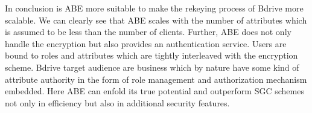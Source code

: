 In conclusion is \ac{ABE} more suitable to make the rekeying process of Bdrive more scalable. We can clearly see that \ac{ABE} scales with the number of attributes which is assumed to be less than the number of clients. Further, \ac{ABE} does not only handle the encryption but also provides an authentication service. Users are bound to roles and attributes which are tightly interleaved with the encryption scheme. Bdrive target audience are business which by nature have some kind of attribute authority in the form of role management and authorization mechanism embedded. Here \ac{ABE} can enfold its true potential and outperform SGC schemes not only in efficiency but also in additional security features. 

